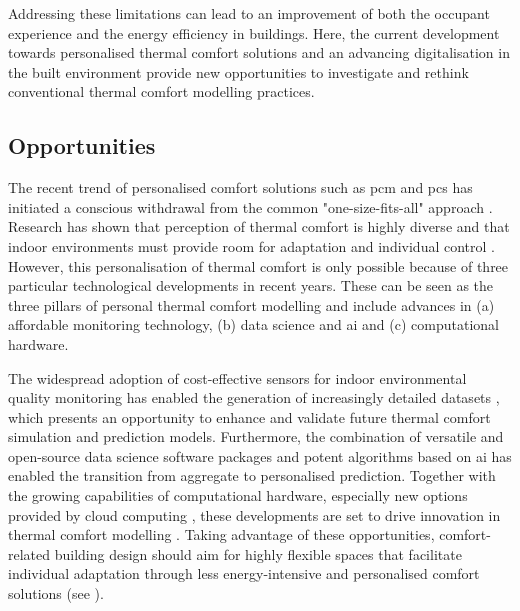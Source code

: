 Addressing these limitations can lead to an improvement of both the occupant experience and the energy efficiency in buildings. Here, the current development towards personalised thermal comfort solutions \citep{KimSchiavon2018} and an advancing digitalisation in the built environment \citep{Whyte2017} provide new opportunities to investigate and rethink conventional thermal comfort modelling practices.



\subsection{Opportunities}

The recent trend of personalised comfort solutions such as \gls{pcm} and \gls{pcs} has initiated a conscious withdrawal from the common "one-size-fits-all" approach \citep{KimSchiavon2018, Rawal2020, Xie2020}. Research has shown that perception of thermal comfort is highly diverse \citep{Wang2018} and that indoor environments must provide room for adaptation and individual control \citep{VanHoof2008, Brager2015}. However, this personalisation of thermal comfort is only possible because of three particular technological developments in recent years. These can be seen as the three pillars of personal thermal comfort modelling and include advances in (a) affordable monitoring technology, (b) data science and \gls{ai} and (c) computational hardware.

The widespread adoption of cost-effective sensors for indoor environmental quality monitoring has enabled the generation of increasingly detailed datasets \citep{Chojer2020, Parkinson2019a, Li2020, Fierro2019, Kent2023}, which presents an opportunity to enhance and validate future thermal comfort simulation and prediction models. Furthermore, the combination of versatile and open-source data science software packages and potent algorithms based on \gls{ai} has enabled the transition from aggregate to personalised prediction. Together with the growing capabilities of computational hardware, especially new options provided by cloud computing \citep{Clarke2015}, these developments are set to drive innovation in thermal comfort modelling \citep{Ngarambe2020}. Taking advantage of these opportunities, comfort-related building design should aim for highly flexible spaces that facilitate individual adaptation through less energy-intensive and personalised comfort solutions (see ).


